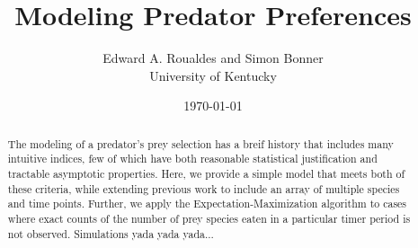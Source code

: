 \documentclass[12pt]{article}
\begin{document}
\title{Modeling Predator Preferences}
\author{Edward A. Roualdes and Simon Bonner \\ University of Kentucky}
\date{\today}
\maketitle


\begin{abstract}
The modeling of a predator's prey selection has a breif history that includes many intuitive indices, few of which have both reasonable statistical justification and tractable asymptotic properties.  Here, we provide a simple model that meets both of these criteria, while extending previous work to include an array of multiple species and time points.  Further, we apply the Expectation-Maximization algorithm to cases where exact counts of the number of prey species eaten in a particular timer period is not observed.  Simulations yada yada yada...
\end{abstract}









\end{document}
